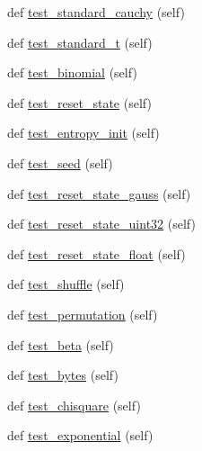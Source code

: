 \begin{DoxyCompactItemize}
\item 
def \hyperlink{classnumpy_1_1random_1_1tests_1_1test__smoke_1_1RNG_a49b96636abd8d1d91e4228f6507e0244}{test\+\_\+standard\+\_\+cauchy} (self)
\item 
def \hyperlink{classnumpy_1_1random_1_1tests_1_1test__smoke_1_1RNG_a0be0034b21d6124115321a4371f66c97}{test\+\_\+standard\+\_\+t} (self)
\item 
def \hyperlink{classnumpy_1_1random_1_1tests_1_1test__smoke_1_1RNG_a5e6002536f333b022f3670921279f2d8}{test\+\_\+binomial} (self)
\item 
def \hyperlink{classnumpy_1_1random_1_1tests_1_1test__smoke_1_1RNG_abd770c8f4b5b526515aca7e4930d40ce}{test\+\_\+reset\+\_\+state} (self)
\item 
def \hyperlink{classnumpy_1_1random_1_1tests_1_1test__smoke_1_1RNG_a0cf602781f7a7b4ea8b7f128d2d74651}{test\+\_\+entropy\+\_\+init} (self)
\item 
def \hyperlink{classnumpy_1_1random_1_1tests_1_1test__smoke_1_1RNG_ae71997e3f50911bf092026f242735c6b}{test\+\_\+seed} (self)
\item 
def \hyperlink{classnumpy_1_1random_1_1tests_1_1test__smoke_1_1RNG_ae59c62da468366d592e375c671ecbf5f}{test\+\_\+reset\+\_\+state\+\_\+gauss} (self)
\item 
def \hyperlink{classnumpy_1_1random_1_1tests_1_1test__smoke_1_1RNG_ae9998ca371be94b0397a9be1525367ac}{test\+\_\+reset\+\_\+state\+\_\+uint32} (self)
\item 
def \hyperlink{classnumpy_1_1random_1_1tests_1_1test__smoke_1_1RNG_a0715d1f8183f24b1f2e60f859a4cc89c}{test\+\_\+reset\+\_\+state\+\_\+float} (self)
\item 
def \hyperlink{classnumpy_1_1random_1_1tests_1_1test__smoke_1_1RNG_a3ae99afc244a212d4cf591fde8cc2a45}{test\+\_\+shuffle} (self)
\item 
def \hyperlink{classnumpy_1_1random_1_1tests_1_1test__smoke_1_1RNG_af4ba4b7f051eb40f767140cec6d1e851}{test\+\_\+permutation} (self)
\item 
def \hyperlink{classnumpy_1_1random_1_1tests_1_1test__smoke_1_1RNG_ac5e5cc4ffe650cb9207273df251fbe69}{test\+\_\+beta} (self)
\item 
def \hyperlink{classnumpy_1_1random_1_1tests_1_1test__smoke_1_1RNG_a223fdb931d167e938c42c205cc6a6cdc}{test\+\_\+bytes} (self)
\item 
def \hyperlink{classnumpy_1_1random_1_1tests_1_1test__smoke_1_1RNG_a79fd4c98b05404c509432a94254f3bda}{test\+\_\+chisquare} (self)
\item 
def \hyperlink{classnumpy_1_1random_1_1tests_1_1test__smoke_1_1RNG_a479b3f8224a0c03a6471988b5581d7f3}{test\+\_\+exponential} (self)

\end{DoxyCompactItemize}
